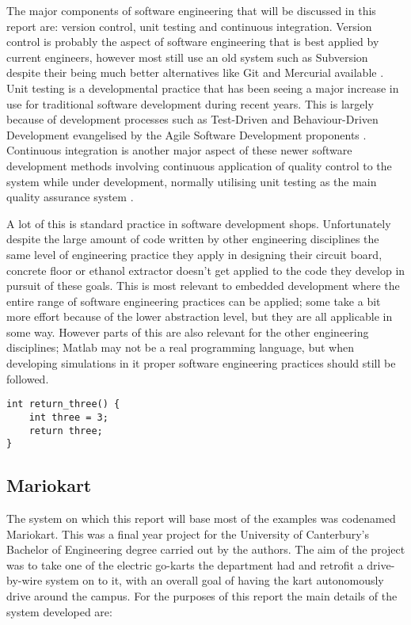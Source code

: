     The major components of software engineering that will be discussed in this
    report are: version control, unit testing and continuous integration.
    Version control is probably the aspect of software engineering that is best
    applied by current engineers, however most still use an old system such as
    Subversion despite their being much better alternatives like Git and
    Mercurial available
    \cite{Glassy:2006:UVC:1089182.1089195,Gurbani:2005:CSO:1083258.1083264}.
    Unit testing is a developmental practice that has been seeing a major
    increase in use for traditional software development during recent years.
    This is largely because of development processes such as Test-Driven and
    Behaviour-Driven Development evangelised by the Agile Software Development
    proponents \cite{Muller:2001:CSE:381473.381536}.  Continuous integration is
    another major aspect of these newer software development methods involving
    continuous application of quality control to the system while under
    development, normally utilising unit testing as the main quality assurance
    system \cite{Holck}.

    A lot of this is standard practice in software development shops.
    Unfortunately despite the large amount of code written by other engineering
    disciplines the same level of engineering practice they apply in designing
    their circuit board, concrete floor or ethanol extractor doesn't get applied
    to the code they develop in pursuit of these goals.  This is most relevant
    to embedded development where the entire range of software engineering
    practices can be applied; some take a bit more effort because of the lower
    abstraction level, but they are all applicable in some way.  However parts
    of this are also relevant for the other engineering disciplines; Matlab may
    not be a real programming language, but when developing simulations in it
    proper software engineering practices should still be followed.

\begin{lstlisting}[float,caption={Small function example.},label=function]
int return_three() {
    int three = 3;
    return three;
}
\end{lstlisting}

  \subsection{Mariokart}

    The system on which this report will base most of the examples was codenamed
    Mariokart.  This was a final year project for the University of Canterbury's
    Bachelor of Engineering degree carried out by the authors.  The aim of the
    project was to take one of the electric go-karts the department had and
    retrofit a drive-by-wire system on to it, with an overall goal of having the
    kart autonomously drive around the campus.  For the purposes of this report
    the main details of the system developed are:

